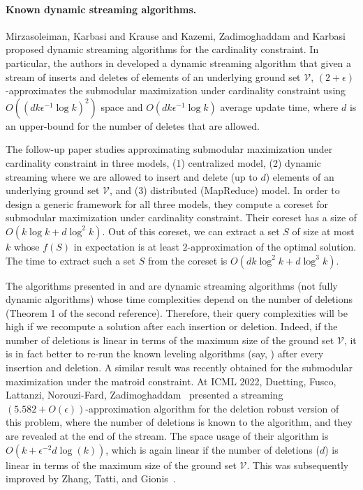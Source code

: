 \documentclass[11pt]{article}
\newcommand{\ground}{\ensuremath{\mathcal{V}}}
\begin{document}
\paragraph{Known dynamic streaming algorithms.}
Mirzasoleiman, Karbasi and Krause \cite{DBLP:conf/icml/MirzasoleimanK017} and
Kazemi, Zadimoghaddam and Karbasi \cite{DBLP:conf/icml/0001ZK18} proposed dynamic streaming algorithms for 
the cardinality constraint. 
In particular,  the authors in \cite{DBLP:conf/icml/MirzasoleimanK017} developed a dynamic streaming algorithm that given
a stream of inserts and deletes of elements of an underlying ground set $\ground$, $(2+\epsilon)$-approximates
the submodular maximization under cardinality constraint using $O((dk\epsilon^{-1}\log k)^2)$ space and
$O(dk\epsilon^{-1}\log k)$ average update time, where $d$ is an upper-bound for the number of deletes that are allowed.

The follow-up paper \cite{DBLP:conf/icml/0001ZK18} studies approximating submodular maximization under cardinality constraint
in three models, (1) centralized model, (2) dynamic streaming where we are allowed to insert and delete (up to $d$) elements
of an underlying ground set $\ground$, and (3) distributed (MapReduce) model.
In order to design a generic framework for all three models, they compute a coreset for submodular maximization
under cardinality constraint. Their coreset has a size of $O(k\log k+d\log^2 k)$. Out of this coreset, we can extract
a set $S$ of size at most $k$ whose $f(S)$ in expectation is at least $2$-approximation of the optimal solution.
The time to extract such a set $S$ from the coreset is $O(dk\log^2 k+d\log^3 k)$. 

The algorithms presented in \cite{DBLP:conf/icml/MirzasoleimanK017} and \cite{DBLP:conf/icml/0001ZK18} 
are dynamic streaming algorithms (not fully dynamic algorithms) whose time complexities depend on 
the number of deletions (Theorem 1 of the second reference). 
Therefore, their query complexities will be high
if we recompute a solution after each insertion or deletion.  
Indeed, if the number of deletions is linear in terms of the maximum size of the ground set $\ground$, 
it is in fact better to re-run the known leveling algorithms (say, \cite{DBLP:journals/mp/NemhauserWF78}) 
after every insertion and deletion.
A similar result was recently obtained for the submodular maximization 
under the matroid constraint. 
At ICML 2022, Duetting,  Fusco, Lattanzi, Norouzi{-}Fard, Zadimoghaddam~\cite{DBLP:conf/icml/DuettingFLNZ22}
presented a streaming $(5.582+O(\epsilon))$-approximation algorithm for 
    the deletion robust version of this problem, where the number of deletions is known to the algorithm, and they are revealed at the end of the stream. 
The space usage of their algorithm is $O(k+\epsilon^{-2}d\log(k))$, 
which is again linear if the number of deletions ($d$) is linear in terms of the maximum size of the ground set $\ground$. 
This was subsequently improved by
Zhang, Tatti, and Gionis~\cite{zhang2022coresets}.
\end{document}
